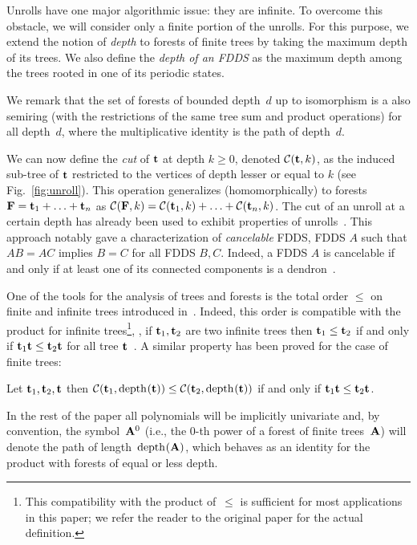Unrolls have one major algorithmic issue: they are infinite. 
To overcome this obstacle, we will consider only a finite portion of the unrolls. 
For this purpose, %
we extend the notion of \emph{depth} to forests of finite trees by taking the maximum depth of its trees. 
We also define the \emph{depth of an FDDS} as the maximum depth among the trees rooted in one of its periodic states.

We remark that the set of forests of bounded depth~$d$ up to isomorphism is a also semiring (with the restrictions of the same tree sum and product operations) for all depth~$d$, where the multiplicative identity is the path of depth~$d$.

We can now define the \emph{cut} of $\tree{t}$ at depth $k \ge 0$, denoted $\cut{\tree{t}}{k}$,
as the induced sub-tree of $\tree{t}$ restricted to the vertices of depth lesser or equal to $k$ (see Fig.~\ref{fig:unroll}). 
This operation generalizes (homomorphically) to forests $\forest{f} = \tree{t}_{1} + \ldots + \tree{t}_{n}$ as  $\cut{\forest{F}}{k} = \cut{\tree{t}_{1}}{k} + \ldots + \cut{\tree{t}_{n}}{k}$. 
The cut of an unroll at a certain depth has already been used to exhibit properties of unrolls~\cite{article_arbre,kroot}.
This approach notably gave a characterization of \emph{cancelable} FDDS, \ie FDDS $A$ such that $AB = AC$ implies $B = C$ for all FDDS $B,C$.
Indeed, a FDDS $A$ is cancelable if and only if at least one of its connected components is a dendron~\cite[Theorem 30]{article_arbre}. 

One of the tools for the analysis of trees and forests is the total order $\le$ on finite and infinite trees introduced in~\cite{article_arbre}.
Indeed, this order is compatible with the product for infinite trees\footnote{This compatibility with the product of~$\le$ is sufficient for most applications in this paper; we refer the reader to the original paper for the actual definition.}, \ie, if $\tree{t}_1, \tree{t}_2$ are two infinite trees then $\tree{t}_1 \le \tree{t}_2$ if and only if $\tree{t}_1 \tree{t} \le \tree{t}_2 \tree{t}$ for all tree $\tree{t}$~\cite[Lemma 24]{article_arbre}. 
A similar property has been proved for the case of finite trees:

\begin{lemma}\label{lemma:ordre_comp_produit}
	Let $\tree{t}_1, \tree{t}_2, \tree{t}$ then $\cut{\tree{t}_1}{\depth{\tree{t}}} \le \cut{\tree{t}_2}{\depth{\tree{t}}}$ if and only if $\tree{t}_1 \tree{t} \le \tree{t}_2 \tree{t}$.
\end{lemma}

In the rest of the paper all polynomials will be implicitly univariate and, by convention, the symbol~$\forest{a}^0$ (i.e., the $0$-th power of a forest of finite trees~$\forest{a}$) will denote the path of length~$\depth{\forest{a}}$, which behaves as an identity for the product with forests of equal or less depth.


